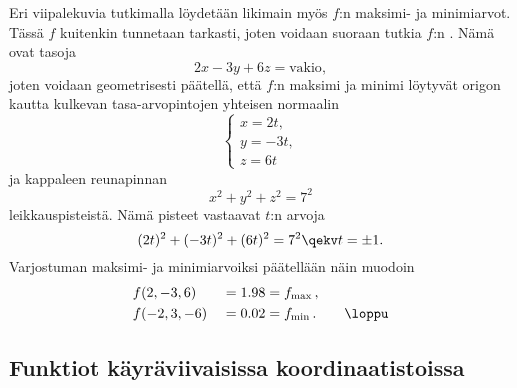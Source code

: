 Eri viipalekuvia tutkimalla löydetään likimain myös $f$:n maksimi- ja minimiarvot. Tässä
%
$f$ kuitenkin tunnetaan tarkasti, joten voidaan suoraan tutkia $f$:n .
Nämä ovat tasoja
\[
2x-3y+6z=\text{vakio},
\]
joten voidaan geometrisesti päätellä, että $f$:n maksimi ja minimi löytyvät origon kautta
kulkevan tasa-arvopintojen yhteisen normaalin
\[
\begin{cases} x=2t, \\ y=-3t, \\ z=6t \end{cases}
\]
ja kappaleen reunapinnan
\[
x^2+y^2+z^2=7^2
\]
leikkauspisteistä. Nämä pisteet vastaavat $t$:n arvoja
\[ 
(2t)^2+(-3t)^2+(6t)^2=7^2 \qekv t= \pm 1. 
\]
Varjostuman maksimi- ja minimiarvoiksi päätellään näin muodoin
\begin{alignat*}{3}
&f(2,-3,6)  &\ = 1.98 &= f_{\text{max}}\,, \\
&f(-2,3,-6) &\ = 0.02 &= f_{\text{min}}\,. \qquad\loppu
\end{alignat*}

\subsection*{Funktiot käyräviivaisissa koordinaatistoissa} 

